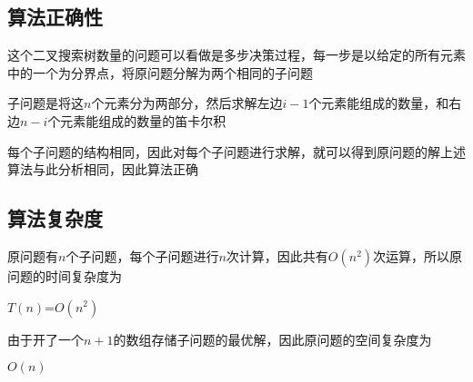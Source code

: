 \documentclass{article}
\begin{document}
\subsection{算法正确性}
这个二叉搜索树数量的问题可以看做是多步决策过程，每一步是以给定的所有元素中的一个为分界点，将原问题分解为两个相同的子问题
\par 子问题是将这$n$个元素分为两部分，然后求解左边$i-1$个元素能组成的数量，和右边$n-i$个元素能组成的数量的笛卡尔积
\par 每个子问题的结构相同，因此对每个子问题进行求解，就可以得到原问题的解上述算法与此分析相同，因此算法正确

\subsection{算法复杂度}
原问题有$n$个子问题，每个子问题进行$n$次计算，因此共有$O(n^2)$次运算，所以原问题的时间复杂度为
\begin{center}
    $T(n)$=$O(n^2)$ 
\end{center} 
\par 由于开了一个$n+1$的数组存储子问题的最优解，因此原问题的空间复杂度为
\begin{center}
    $O(n)$
\end{center} 
\end{document}
